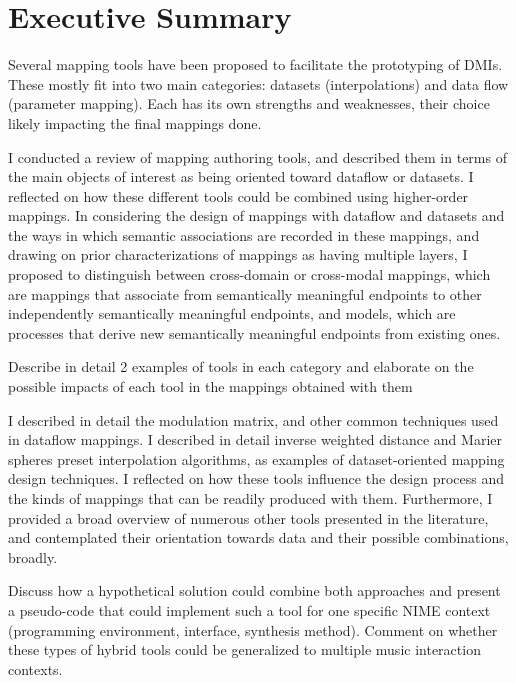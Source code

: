 \documentclass[main.tex]{subfiles}
\begin{document}
\section{Executive Summary}

\begin{displayquote}
Several mapping tools have been proposed to facilitate the prototyping of DMIs.
These mostly fit into two main categories: datasets (interpolations) and data
flow (parameter mapping). Each has its own strengths and weaknesses, their
choice likely impacting the final mappings done.
\end{displayquote}

I conducted a review of mapping authoring tools, and described them in terms of
the main objects of interest as being oriented toward dataflow or datasets. I
reflected on how these different tools could be combined using higher-order
mappings. In considering the design of mappings with dataflow and datasets and
the ways in which semantic associations are recorded in these mappings, and
drawing on prior characterizations of mappings as having multiple layers, I
proposed to distinguish between cross-domain or cross-modal mappings, which are
mappings that associate from semantically meaningful endpoints to other
independently semantically meaningful endpoints, and models, which are
processes that derive new semantically meaningful endpoints from existing ones.

\begin{displayquote}
Describe in detail 2 examples of tools in each category and elaborate on the
possible impacts of each tool in the mappings obtained with them
\end{displayquote}

I described in detail the modulation matrix, and other common techniques used
in dataflow mappings. I described in detail inverse weighted distance and
Marier spheres preset interpolation algorithms, as examples of dataset-oriented
mapping design techniques. I reflected on how these tools influence the design
process and the kinds of mappings that can be readily produced with them.
Furthermore, I provided a broad overview of numerous other tools presented in
the literature, and contemplated their orientation towards data and their
possible combinations, broadly.

\begin{displayquote}
Discuss how a hypothetical solution could combine both approaches and present a
pseudo-code that could implement such a tool for one specific NIME context
(programming environment, interface, synthesis method). Comment on whether
these types of hybrid tools could be generalized to multiple music interaction
contexts.
\end{displayquote}
\end{document}
